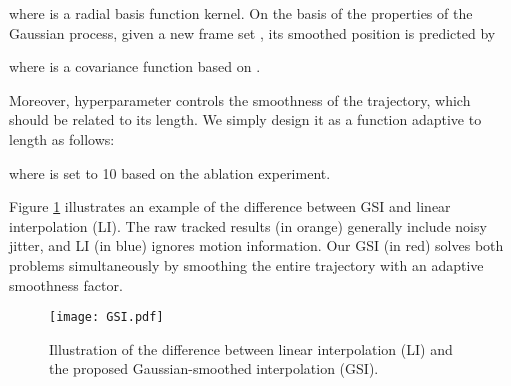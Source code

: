 \documentclass[lettersize,journal]{IEEEtran}
\begin{document}
where  is a radial basis function kernel.
On the basis of the properties of the Gaussian process, given a new frame set , its smoothed position  is predicted by

where  is a covariance function based on .

Moreover, hyperparameter  controls the smoothness of the trajectory, which should be related to its length.
We simply design it as a function adaptive to length  as follows:

where  is set to 10 based on the ablation experiment.

Figure \ref{figure_GSI} illustrates an example of the difference between GSI and linear interpolation (LI).
The raw tracked results (in orange) generally include noisy jitter, and LI (in blue) ignores motion information.
Our GSI (in red) solves both problems simultaneously by smoothing the entire trajectory with an adaptive smoothness factor.

\begin{figure}[t]
  \centering
  \texttt{[image: GSI.pdf]}
  \caption{
    Illustration of the difference between linear interpolation (LI) and the proposed Gaussian-smoothed interpolation (GSI).
  }
  \label{figure_GSI}
\end{figure}
\end{document}
